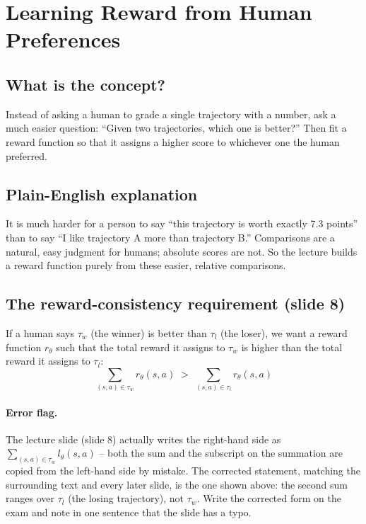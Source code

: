 \documentclass[11pt]{article}
\begin{document}
\section{Learning Reward from Human Preferences}

\subsection{What is the concept?}
Instead of asking a human to grade a single trajectory with a number, ask a much
easier question: ``Given two trajectories, which one is better?'' Then fit a
reward function so that it assigns a higher score to whichever one the human
preferred.

\subsection{Plain-English explanation}
It is much harder for a person to say ``this trajectory is worth exactly 7.3
points'' than to say ``I like trajectory A more than trajectory B.'' Comparisons
are a natural, easy judgment for humans; absolute scores are not. So the lecture
builds a reward function purely from these easier, relative comparisons.

\subsection{The reward-consistency requirement (slide 8)}
If a human says $\tau_w$ (the winner) is better than $\tau_l$ (the loser), we want
a reward function $r_\theta$ such that the total reward it assigns to $\tau_w$ is
higher than the total reward it assigns to $\tau_l$:
\[
\sum_{(s,a)\in\tau_w} r_\theta(s,a) \;>\; \sum_{(s,a)\in\tau_l} r_\theta(s,a)
\]

\paragraph{Error flag.} The lecture slide (slide 8) actually writes the
right-hand side as $\sum_{(s,a)\in\tau_w} l_\theta(s,a)$ -- both the sum and the
subscript on the summation are copied from the left-hand side by mistake. The
corrected statement, matching the surrounding text and every later slide, is the
one shown above: the second sum ranges over $\tau_l$ (the losing trajectory), not
$\tau_w$. Write the corrected form on the exam and note in one sentence that the
slide has a typo.
\end{document}
